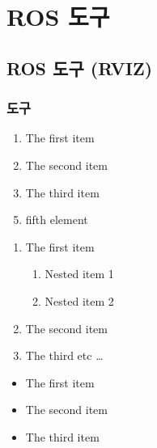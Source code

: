 
\chapter{ROS 도구}

\section{ROS 도구 (RVIZ)}

\subsection{도구}


\begin{enumerate}
\item The first item
\item The second item
\item The third item
\end{enumerate}

\begin{enumerate}
  \setcounter{enumi}{4}
  \item fifth element
\end{enumerate}

\begin{enumerate}
  \item The first item
  \begin{enumerate}
    \item Nested item 1
    \item Nested item 2
  \end{enumerate}
  \item The second item
  \item The third etc \ldots
\end{enumerate}


\begin{itemize}
\item The first item
\item The second item
\item The third item
\end{itemize}

